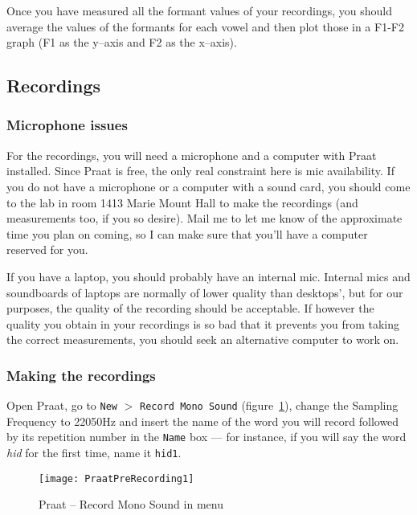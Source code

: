 \documentclass{article}
\newcommand{\soft}[1]{\textsf{#1}}
\newcommand{\softmenu}[1]{\texttt{#1}}
\newcommand{\Praat}{\soft{Praat}}
\begin{document}
Once you have measured all the formant values of your recordings, you should average the values of the formants for each vowel and then plot those in a F1-F2 graph (F1 as the y--axis and F2 as the x--axis).

\subsection{Recordings}

\subsubsection{Microphone issues}

For the recordings, you will need a microphone and a computer with \Praat{} installed. Since \Praat{} is free, the only real constraint here is mic availability. If you do not have a microphone or a computer with a sound card, you should come to the lab in room 1413 Marie Mount Hall to make the recordings (and measurements too, if you so desire). Mail me to let me know of the approximate time you plan on coming, so I can make sure that you'll have a computer reserved for you. 

If you have a laptop, you should probably have an internal mic. Internal mics and soundboards of laptops are normally of lower quality than desktops', but for our purposes, the quality of the recording should be acceptable. If however the quality you obtain in your recordings is so bad that it prevents you from taking the correct measurements, you should seek an alternative computer to work on.

\subsubsection{Making the recordings}

Open \Praat{}, go to \softmenu{New} $>$ \softmenu{Record Mono Sound} (figure~\ref{step1rec}), change the Sampling Frequency to 22050Hz and insert the name of the word you will record followed by its repetition number in the \softmenu{Name} box --- for instance, if you will say the word \emph{hid} for the first time, name it \softmenu{hid1}.

\begin{figure}[!tbp]
\caption{\Praat{} -- Record Mono Sound in menu}
\label{step1rec}
	\begin{center}
		\texttt{[image: PraatPreRecording1]}
	\end{center}
\end{figure}
\end{document}

